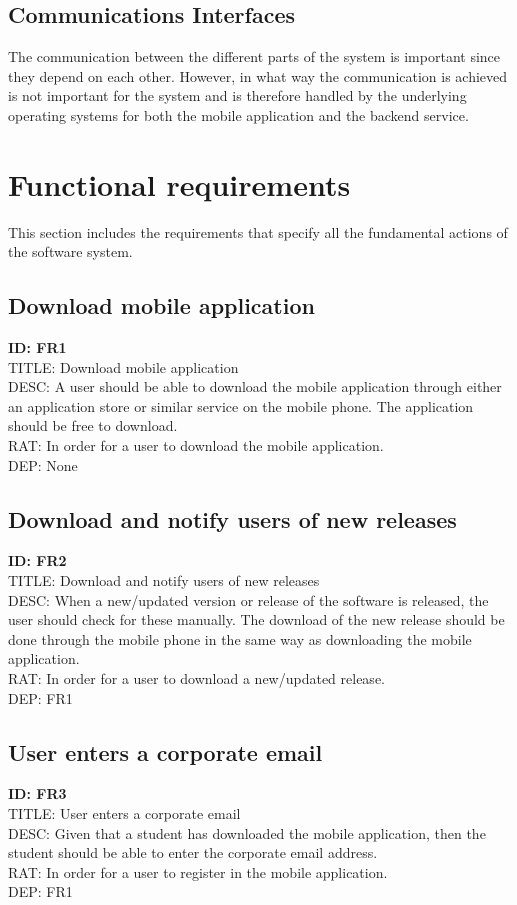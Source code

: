 \documentclass{scrreprt}
\begin{document}
\subsection{Communications Interfaces}
The communication between the different parts of the system is important since they depend on each
other. However, in what way the communication is achieved is not important for the system and is
therefore handled by the underlying operating systems for both the mobile application and the backend service.

\section{Functional requirements}
This section includes the requirements that specify all the fundamental actions of the software system.
\subsection{Download mobile application}
\textbf{ID: FR1}\\
TITLE: Download mobile application\\
DESC: A user should be able to download the mobile application through either an application store or
similar service on the mobile phone. The application should be free to download.\\
RAT: In order for a user to download the mobile application.\\
DEP: None

\subsection{Download and notify users of new releases}
\textbf{ID: FR2}\\
TITLE: Download and notify users of new releases\\
DESC: When a new/updated version or release of the software is released, the user should check for these
manually. The download of the new release should be done through the mobile phone in the same way as
downloading the mobile application.\\
RAT: In order for a user to download a new/updated release.\\
DEP: FR1

\subsection{User enters a corporate email}
\textbf{ID: FR3}\\
TITLE: User enters a corporate email\\
DESC: Given that a student has downloaded the mobile application, then the student should be able to enter the corporate email address.\\
RAT: In order for a user to register in the mobile application.\\
DEP: FR1
\end{document}
